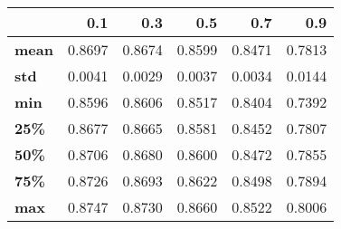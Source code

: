 \begin{tabular}{lrrrrr}
\toprule
{} &     0.1 &     0.3 &     0.5 &     0.7 &     0.9 \\
\midrule
\textbf{mean} &  0.8697 &  0.8674 &  0.8599 &  0.8471 &  0.7813 \\
\textbf{std } &  0.0041 &  0.0029 &  0.0037 &  0.0034 &  0.0144 \\
\textbf{min } &  0.8596 &  0.8606 &  0.8517 &  0.8404 &  0.7392 \\
\textbf{25\% } &  0.8677 &  0.8665 &  0.8581 &  0.8452 &  0.7807 \\
\textbf{50\% } &  0.8706 &  0.8680 &  0.8600 &  0.8472 &  0.7855 \\
\textbf{75\% } &  0.8726 &  0.8693 &  0.8622 &  0.8498 &  0.7894 \\
\textbf{max } &  0.8747 &  0.8730 &  0.8660 &  0.8522 &  0.8006 \\
\bottomrule
\end{tabular}
